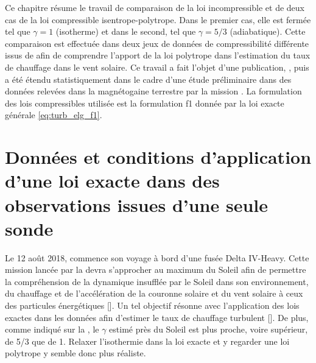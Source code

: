 Ce chapitre résume le travail de comparaison de la loi incompressible  et de deux cas de la loi compressible isentrope-polytrope. Dans le premier cas, elle est fermée tel que $\gamma = 1$ (isotherme) et dans le second, tel que $\gamma = 5/3$ (adiabatique). Cette comparaison est effectuée dans deux jeux de données de compressibilité différente issus de  afin de comprendre l'apport de la loi polytrope dans l'estimation du taux de chauffage dans le vent solaire. Ce travail a fait l'objet d'une publication, \cite{simon_general_2021}, puis a été étendu statistiquement dans le cadre d'une étude préliminaire dans des données relevées dans la magnétogaine terrestre par la mission . La formulation des lois compressibles utilisée est la formulation f1 donnée par la loi exacte générale \eqref{eq:turb_elg_f1}. 

\section{Données et conditions d'application d'une loi exacte dans des observations issues d'une seule sonde}
\label{sec-141}

Le 12 août 2018,  commence son voyage à bord d'une fusée Delta IV-Heavy. Cette mission lancée par la  devra s'approcher au maximum du Soleil afin de permettre la compréhension de la dynamique insufflée par le Soleil dans son environnement, du chauffage et de l'accélération de la couronne solaire et du vent solaire à ceux des particules énergétiques [\cite{fox_solar_2016}]. Un tel objectif résonne avec l'application des lois exactes dans les données afin d'estimer le taux de chauffage turbulent [\cite{parashar_observations_2022}]. De plus, comme indiqué sur la , le $\gamma$ estimé près du Soleil est plus proche, voire supérieur, de 5/3 que de 1. Relaxer l'isothermie dans la loi exacte et y regarder une loi polytrope y semble donc plus réaliste. 

